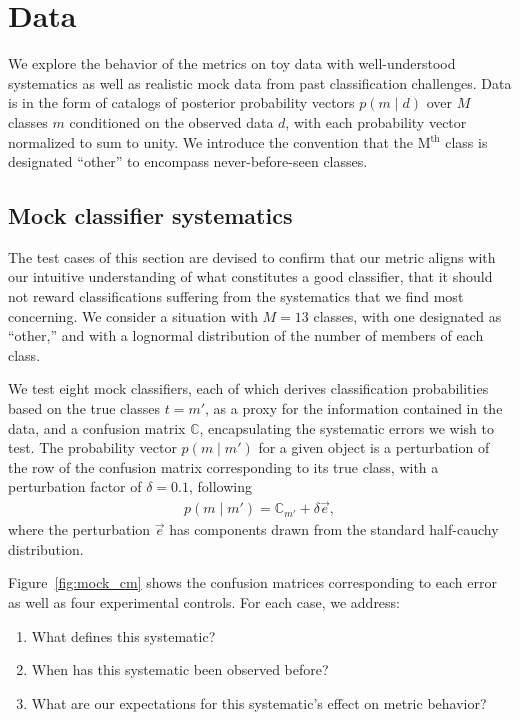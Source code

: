 \section{Data}
\label{sec:data}

We explore the behavior of the metrics on toy data with well-understood systematics as well as realistic mock data from past classification challenges.
Data is in the form of catalogs of posterior probability vectors $p(m \mid d)$ over $M$ classes $m$ conditioned on the observed data $d$, with each probability vector normalized to sum to unity.
We introduce the convention that the M$^{\mathrm{th}}$ class is designated ``other'' to encompass never-before-seen classes.

\subsection{Mock classifier systematics}
\label{sec:mockdata}

The test cases of this section are devised to confirm that our metric aligns with our intuitive understanding of what constitutes a good classifier, that it should not reward classifications suffering from the systematics that we find most concerning.
We consider a situation with $M=13$ classes, with one designated as ``other,'' and with a lognormal distribution of the number of members of each class.

We test eight mock classifiers, each of which derives classification probabilities based on the true classes $t = m'$, as a proxy for the information contained in the data, and a confusion matrix $\mathbb{C}$, encapsulating the systematic errors we wish to test.
The probability vector $p(m \mid m')$ for a given object is a perturbation of the row of the confusion matrix corresponding to its true class, with a perturbation factor of $\delta=0.1$, following
\begin{eqnarray}
  \label{eq:cmtoprob}
  p(m \mid m') = \mathbb{C}_{m'} + \delta\vec{e},
\end{eqnarray}
where the perturbation $\vec{e}$ has components drawn from the standard half-cauchy distribution.

Figure~\ref{fig:mock_cm} shows the confusion matrices corresponding to each error as well as four experimental controls.
For each case, we address:
\begin{enumerate}
  \item What defines this systematic?
  \item When has this systematic been observed before?
  \item What are our expectations for this systematic's effect on metric behavior?
\end{enumerate}

